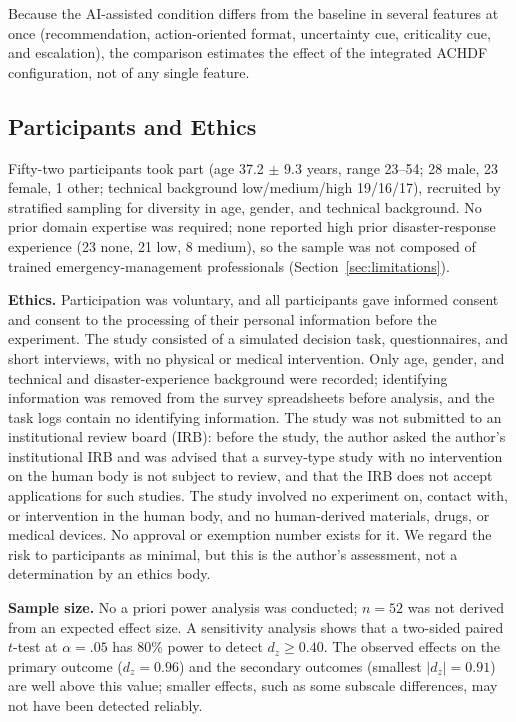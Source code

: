 \documentclass[journal]{IEEEtran}
\theoremstyle{plain}
\theoremstyle{definition}
\begin{document}
    Because the AI-assisted condition differs from the baseline in several features at once (recommendation, action-oriented format, uncertainty cue, criticality cue, and escalation), the comparison estimates the effect of the integrated ACHDF configuration, not of any single feature.

    \subsection{Participants and Ethics}
    \label{sec:participants}

    Fifty-two participants took part (age 37.2 $\pm$ 9.3 years, range 23--54; 28 male, 23 female, 1 other; technical background low/medium/high 19/16/17), recruited by stratified sampling for diversity in age, gender, and technical background. No prior domain expertise was required; none reported high prior disaster-response experience (23 none, 21 low, 8 medium), so the sample was not composed of trained emergency-management professionals (Section~\ref{sec:limitations}).

    \textbf{Ethics.} Participation was voluntary, and all participants gave informed consent and consent to the processing of their personal information before the experiment. The study consisted of a simulated decision task, questionnaires, and short interviews, with no physical or medical intervention. Only age, gender, and technical and disaster-experience background were recorded; identifying information was removed from the survey spreadsheets before analysis, and the task logs contain no identifying information. The study was not submitted to an institutional review board (IRB): before the study, the author asked the author's institutional IRB and was advised that a survey-type study with no intervention on the human body is not subject to review, and that the IRB does not accept applications for such studies. The study involved no experiment on, contact with, or intervention in the human body, and no human-derived materials, drugs, or medical devices. No approval or exemption number exists for it. We regard the risk to participants as minimal, but this is the author's assessment, not a determination by an ethics body.

    \textbf{Sample size.} No a priori power analysis was conducted; $n=52$ was not derived from an expected effect size. A sensitivity analysis shows that a two-sided paired $t$-test at $\alpha=.05$ has 80\% power to detect $d_z \geq 0.40$. The observed effects on the primary outcome ($d_z = 0.96$) and the secondary outcomes (smallest $|d_z| = 0.91$) are well above this value; smaller effects, such as some subscale differences, may not have been detected reliably.
\end{document}
